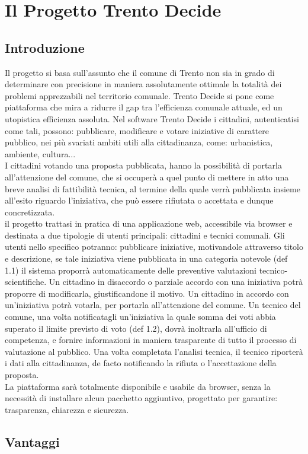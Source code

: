 \chapter{Il Progetto Trento Decide}

\section{Introduzione}
Il progetto si basa sull'assunto che il comune di Trento non sia in grado di determinare con precisione in maniera assolutamente ottimale la totalità dei problemi apprezzabili nel territorio comunale. Trento Decide si pone come piattaforma che mira a ridurre il gap tra l'efficienza comunale attuale, ed un utopistica efficienza assoluta. Nel software Trento Decide i cittadini, autenticatisi come tali, possono: pubblicare, modificare e votare iniziative di carattere pubblico, nei più svariati ambiti utili alla cittadinanza, come: urbanistica, ambiente, cultura... \\
I cittadini votando una proposta pubblicata, hanno la possibilità di portarla all'attenzione del comune, che si occuperà a quel punto di mettere in atto una breve analisi di fattibilità tecnica, al termine della quale verrà pubblicata insieme all'esito riguardo l'iniziativa, che può essere rifiutata o accettata e dunque concretizzata. \\
il progetto trattasi in pratica di una applicazione web, accessibile via browser e destinata a due tipologie di utenti principali: cittadini e tecnici comunali.
Gli utenti nello specifico potranno: pubblicare iniziative, motivandole attraverso titolo e descrizione, se tale iniziativa viene pubblicata in una categoria notevole (def 1.1) il sistema proporrà automaticamente delle preventive valutazioni tecnico-scientifiche. Un cittadino in disaccordo o parziale accordo con una iniziativa potrà proporre di modificarla, giustificandone il motivo. Un cittadino in accordo con un'iniziativa potrà votarla, per portarla all'attenzione del comune. Un tecnico del comune, una volta notificatagli un'iniziativa la quale somma dei voti abbia superato il limite previsto di voto (def 1.2), dovrà inoltrarla all'ufficio di competenza, e fornire informazioni in maniera trasparente di tutto il processo di valutazione al pubblico. Una volta completata l'analisi tecnica, il tecnico riporterà i dati alla cittadinanza, de facto notificando la rifiuta o l'accettazione della proposta. \\
La piattaforma sarà totalmente disponibile e usabile da browser, senza la necessità di installare alcun pacchetto aggiuntivo, progettato per garantire: trasparenza, chiarezza e sicurezza.

\section{Vantaggi}
